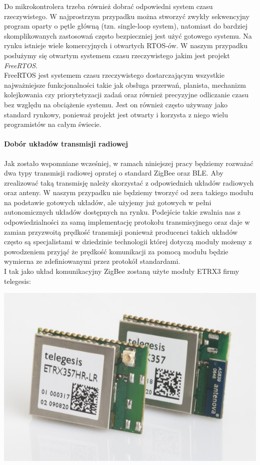 Do mikrokontrolera trzeba również dobrać odpowiedni system czasu rzeczywistego. W najprostrzym przypadku można stworzyć zwykły sekwencyjny program oparty o pętle główną (tzn. single-loop system), natomiast do bardziej skomplikowanych zastosowań często bezpieczniej jest użyć gotowego systemu. Na rynku istnieje wiele komercyjnych i otwartych RTOS-ów. W naszym przypadku posłużymy się otwartym systemem czasu rzeczywistego jakim jest projekt \textit{FreeRTOS}. \\
FreeRTOS jest systemem czasu rzeczywistego dostarczającym wszystkie najważniejsze funkcjonalności takie jak obsługa przerwań, planista, mechanizm kolejkowania czy priorytetyzacji zadań oraz również precyzyjne odliczanie czasu bez względu na obciążenie systemu.
Jest on również często używany jako standard rynkowy, ponieważ projekt jest otwarty i korzysta z niego wielu programistów na całym świecie. \\

\paragraph{Dobór układów transmisji radiowej}

Jak zostało wspomniane wcześniej, w ramach niniejszej pracy będziemy rozważać dwa typy transmisji radiowej opratej o standard ZigBee oraz BLE. Aby zrealizować taką transmisję należy skorzystać z odpowiednich układów radiowych oraz anteny. W naszym przypadku nie będziemy tworzyć od zera takiego modułu na podstawie gotowych układów, ale użyjemy już gotowych w pełni autonomicznych układów dostępnych na rynku. Podejście takie zwalnia nas z odpowiedzialności za samą implementację protokołu transmisyjnego oraz daje w zamian przyzwoitą prędkość transmisji ponieważ producenci takich układów często są specjalistami w dziedzinie technologii której dotyczą moduły możemy z powodzeniem przyjąć że prędkość komunikacji za pomocą modułu będzie wymierna ze zdefiniowanymi przez protokół standardami. \\
I tak jako układ komunikacyjny ZigBee zostaną użyte moduły ETRX3 firmy telegesis:

\centerline{\includegraphics[scale=0.90]{./img/target_system/etrx3-modul.jpg}} 


